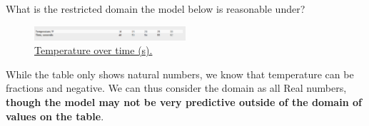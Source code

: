 \documentclass{ximera}
\begin{document}
\begin{question}
What is the restricted domain the model below is reasonable under?
\begin{figure}
\includegraphics[width=0.5\textwidth]{temperature.png}
\caption{\href{https://cnx.org/contents/mwjClAV_@8.12:6dX4RGdg@12/Fitting-Linear-Models-to-Data}{Temperature over time (s).}}
\end{figure}

\begin{multipleChoice}
\end{multipleChoice}

\begin{feedback}[correct]
While the table only shows natural numbers, we know that temperature can be fractions and negative. We can thus consider the domain as all Real numbers, \textbf{though the model may not be very predictive outside of the domain of values on the table}.
\end{feedback}


\end{question}
\end{document}
